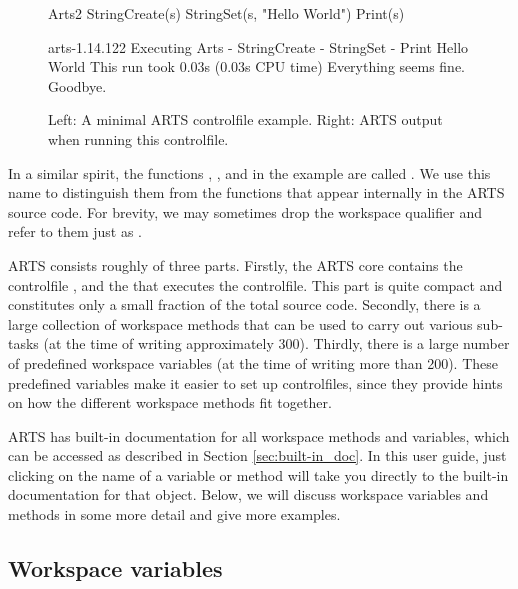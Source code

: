 \begin{figure}
\footnotesize
\begin{minipage}[t]{0.35\hsize}
\begin{code}
Arts2 {
StringCreate(s)
StringSet(s,
   "Hello World")
Print(s)
}
\end{code}
\end{minipage}
\hspace*{\fill}
\begin{minipage}[t]{0.5\hsize}
\begin{code}
arts-1.14.122
Executing Arts
{
- StringCreate
- StringSet
- Print
Hello World
}
This run took 0.03s (0.03s CPU time)
Everything seems fine. Goodbye.
\end{code}
\end{minipage}
\caption{Left: A minimal ARTS controlfile example. Right: ARTS output
  when running this controlfile. } 
\label{fig:hello}
\end{figure}

In a similar spirit, the functions ,
, and  in the example are called
\emph{}. We use this name to distinguish
them from the functions that appear internally in the ARTS source
code. For brevity, we may sometimes drop the workspace qualifier and
refer to them just as .

ARTS consists roughly of three parts. Firstly, the ARTS core contains the
controlfile , and the  that executes the controlfile. This part is
quite compact and constitutes only a small fraction of the total source code.
Secondly, there is a large collection of workspace methods that can be used to
carry out various sub-tasks (at the time of writing approximately 300).
Thirdly, there is a large number of predefined workspace variables (at the time
of writing more than 200). These predefined variables make it easier to set up
controlfiles, since they provide hints on how the different workspace methods
fit together.

ARTS has built-in documentation for all workspace methods and
variables, which can be accessed as described in Section
\ref{sec:built-in_doc}.  In this user guide, just clicking on the name
of a variable or method will take you directly to the built-in
documentation for that object.  Below, we will discuss workspace
variables and methods in some more detail and give more examples.

\subsection{Workspace variables}

